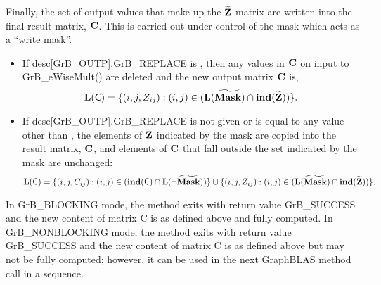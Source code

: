 Finally, the set of output values that make up the ${\bf \widetilde{Z}}$ 
matrix are written into the final result matrix, ${\bf C}$. 
This is carried out under control of the mask which acts as a ``write mask''.
\begin{itemize}
\item If {\sf desc[GrB\_OUTP].GrB\_REPLACE} is \true, then any values in ${\bf C}$ 
on input to {\sf GrB\_eWiseMult()} are deleted and the new output matrix ${\bf C}$ is,
\[ \bold{L}({\sf C}) = \{(i,j,Z_{ij}) : (i,j) \in (\bold{L}({\bf \widetilde{Mask}}) 
\cap \bold{ind}({\bf \widetilde{Z}})) \}. \]

\item If {\sf desc[GrB\_OUTP].GrB\_REPLACE} is not given or is equal to any 
value other than \true, the elements of ${\bf \widetilde{Z}}$ indicated by 
the mask are copied into the result matrix, ${\bf C}$, and elements of 
${\bf C}$ that fall outside the set indicated by the mask are unchanged:
\[ \bold{L}({\sf C}) = \{(i,j,C_{ij}) : (i,j) \in (\bold{ind}({\bf \sf C}) 
\cap \bold{L}(\neg {\bf \widetilde{Mask}})) \} \cup \{(i,j,Z_{ij}) : (i,j) \in 
(\bold{L}({\bf \widetilde{Mask}}) \cap \bold{ind}({\bf \widetilde{Z}})) \}. \]
\end{itemize}

In {\sf GrB\_BLOCKING} mode, the method exits with return value 
{\sf GrB\_SUCCESS} and the new content of matrix {\sf C} is as defined above
and fully computed.  
In {\sf GrB\_NONBLOCKING} mode, the method exits with return value 
{\sf GrB\_SUCCESS} and the new content of matrix {\sf C} is as defined above 
but may not be fully computed; however, it can be used in the next GraphBLAS 
method call in a sequence.


